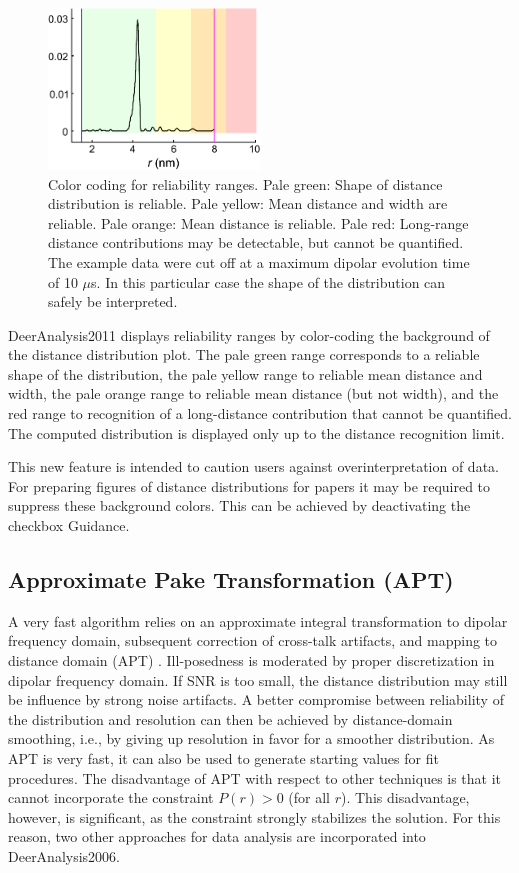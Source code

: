 \documentclass{article}
\begin{document}
\begin{figure}[ht]
 	\begin{center}
  \includegraphics[width=0.5\textwidth]{fig_reliability.pdf}
	\end{center}
	\caption{Color coding for reliability ranges. Pale green: Shape of distance distribution is reliable. Pale yellow: Mean distance and width are reliable. Pale orange: Mean distance is reliable. Pale red: Long-range distance contributions may be detectable, but cannot be quantified. The example data were cut off at a maximum dipolar evolution time of 10 $\mu$s. In this particular case the shape of the distribution can safely be interpreted.}
	\label{fig:reliability}
\end{figure}

DeerAnalysis2011 displays reliability ranges by color-coding the background of the distance distribution plot. The pale green range
corresponds to a reliable shape of the distribution, the pale yellow range to reliable mean distance and width, the pale orange range to 
reliable mean distance (but not width), and the red range to recognition of a long-distance contribution that cannot be quantified. The computed distribution is displayed only up to the distance recognition limit.

This new feature is intended to caution users against overinterpretation of data. For preparing figures of distance distributions for papers it may be required to suppress these background colors. This can be achieved by deactivating the checkbox {\ttfamily Guidance}.

\subsection{Approximate Pake Transformation (APT)}
A very fast algorithm relies on an approximate integral transformation to
dipolar frequency domain, subsequent correction of cross-talk artifacts, and
mapping to distance domain (APT) \cite{jeschke2001}. Ill-posedness is moderated by proper
discretization in dipolar frequency domain. If SNR is too small, the distance
distribution may still be influence by strong noise artifacts. A better
compromise between reliability of the distribution and resolution can then be
achieved by distance-domain smoothing, i.e., by giving up resolution in favor
for a smoother distribution. As APT is very fast, it can also be used to generate
starting values for fit procedures. The disadvantage of APT with respect
to other techniques is that it cannot incorporate the constraint $P(r) > 0$ (for
all $r$). This disadvantage, however, is significant, as the constraint strongly
stabilizes the solution. For this reason, two other approaches for data analysis
are incorporated into DeerAnalysis2006.
\end{document}
